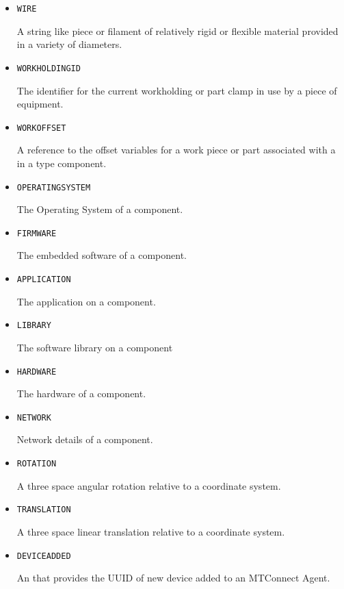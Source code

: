 \begin{itemize}
\item \texttt{WIRE}  

A string like piece or filament of relatively rigid or flexible material provided in a variety of diameters.


\item \texttt{WORKHOLDING\textunderscore ID}  

The identifier for the current workholding or part clamp in use by a piece of equipment.


\item \texttt{WORK\textunderscore OFFSET}  

A reference to the offset variables for a work piece or part associated with a  in a  type component.


\item \texttt{OPERATING\textunderscore SYSTEM}  

The Operating System of a component.


\item \texttt{FIRMWARE}  

The embedded software of a component.



\item \texttt{APPLICATION}  

The application on a component.


\item \texttt{LIBRARY}  

The software library on a component


\item \texttt{HARDWARE}  

The hardware of a component.



\item \texttt{NETWORK}  

Network details of a component.


\item \texttt{ROTATION}  

A three space angular rotation relative to a coordinate system.


\item \texttt{TRANSLATION}  

A three space linear translation relative to a coordinate system.


\item \texttt{DEVICE\textunderscore ADDED}  

An  that provides the \gls{UUID} of new device added to an \gls{MTConnect Agent}.



\end{itemize}
